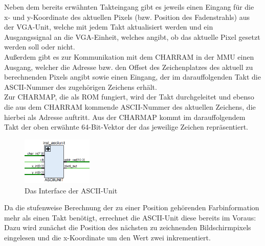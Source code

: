 Neben dem bereits erw\"ahnten Takteingang gibt es jeweils einen Eingang f\"ur die x- und y-Koordinate des aktuellen Pixels (bzw. Position des Fadenstrahls) aus der VGA-Unit, welche mit jedem Takt aktualisiert werden und ein Ausgangssignal an die VGA-Einheit, welches angibt, ob das aktuelle Pixel gesetzt werden soll oder nicht.\\ Au{\ss}erdem gibt es zur Kommunikation mit dem CHARRAM in der MMU einen Ausgang, welcher die Adresse bzw. den Offset des Zeichenplatzes des aktuell zu berechnenden Pixels angibt sowie einen Eingang, der im darauffolgenden Takt die ASCII-Nummer des zugeh\"origen Zeichens erh\"alt.\\
Zur CHARMAP, die als ROM fungiert, wird der Takt durchgeleitet und ebenso die aus dem CHARRAM kommende ASCII-Nummer des aktuellen Zeichens, die hierbei als Adresse auftritt. Aus der CHARMAP kommt im darauffolgendem Takt der oben erw\"ahnte 64-Bit-Vektor der das jeweilige Zeichen repr\"asentiert.

\begin{figure}[H]
	\centering
	\label{fig:interface}
		\includegraphics[width=0.3\textwidth]{Asciiunit.png}
	\caption[Interface der ASCII-Unit]{Das Interface der ASCII-Unit}
\end{figure}


Da die stufenweise Berechnung der zu einer Position geh\"orenden Farbinformation mehr als einen Takt ben\"otigt, errechnet die ASCII-Unit diese bereits im Voraus: Dazu wird zun\"achst die Position des n\"achsten zu zeichnenden Bildschirmpixels eingelesen und die x-Koordinate um den Wert zwei inkrementiert.


